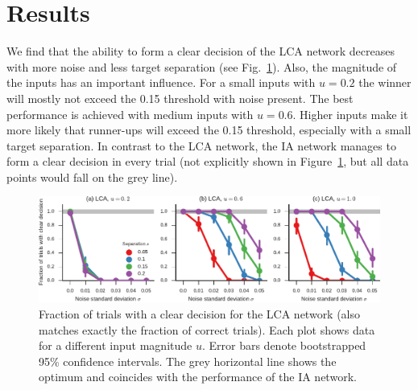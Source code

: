 \documentclass[10pt,letterpaper]{article}
\begin{document}
\section{Results}
We find that the ability to form a clear decision of the LCA network decreases with more noise and less target separation  (see Fig.~\ref{fig:decisions}).
Also, the magnitude of the inputs has an important influence.
For a small inputs with $u=0.2$ the winner will mostly not exceed the 0.15 threshold with noise present.
The best performance is achieved with medium inputs with $u=0.6$.
Higher inputs make it more likely that runner-ups will exceed the 0.15 threshold, especially with a small target separation.
In contrast to the LCA network, the IA network manages to form a clear decision in every trial (not explicitly shown in Figure~\ref{fig:decisions}, but all data points would fall on the grey line).
\begin{figure}[t]
    \centering
    \includegraphics{figures/decisions}
    \caption{
        Fraction of trials with a clear decision for the LCA network (also matches exactly the fraction of correct trials).
        Each plot shows data for a different input magnitude $u$.
        Error bars denote bootstrapped 95\% confidence intervals.
        The grey horizontal line shows the optimum and coincides with the performance of the IA network.
    }\label{fig:decisions}
\end{figure}
\end{document}
